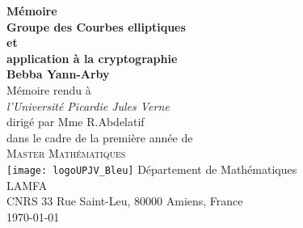 \begin{titlepage}
\begin{center}
  {\huge\bfseries Mémoire \\[1ex] 
                  Groupe des Courbes elliptiques \\
              et \\ [1ex]
          application à la cryptographie}                  \\[6.5ex]
  {\large\bfseries Bebba Yann-Arby}           \\
  \vspace{4ex}
  Mémoire rendu à                    \\[5pt]
  \textit{l'Université Picardie Jules Verne}                \\[1ex]
  dirigé par Mme R.Abdelatif \\ [2cm]
  dans le cadre de la première année de  \\[1ex]
  \textsc{\Large Master Mathématiques}    \\[6ex]
  \texttt{[image: logoUPJV\_Bleu]}
  \vfill
  Département de Mathématiques               \\
  LAMFA \\
  CNRS 33 Rue Saint-Leu, 80000 Amiens, France                                 \\
  \today \\
  \vfill
\end{center}
\end{titlepage}
